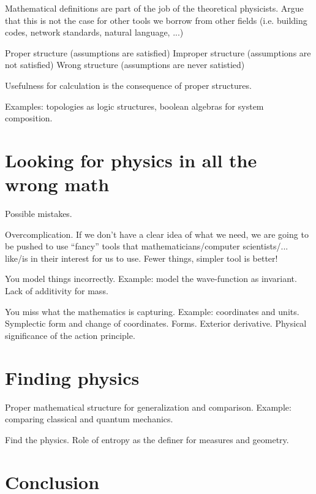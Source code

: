 \documentclass[10pt,twocolumn, nofootinbib]{revtex4-2}
\begin{document}
Mathematical definitions are part of the job of the theoretical physicists. Argue that this is not the case for other tools we borrow from other fields (i.e. building codes, network standards, natural language, ...)

Proper structure (assumptions are satisfied)
Improper structure (assumptions are not satisfied)
Wrong structure (assumptions are never satistied)

Usefulness for calculation is the consequence of proper structures.

Examples: topologies as logic structures, boolean algebras for system composition.

\section{Looking for physics in all the wrong math}

Possible mistakes.

Overcomplication. If we don't have a clear idea of what we need, we are going to be pushed to use ``fancy'' tools that mathematicians/computer scientists/... like/is in their interest for us to use. Fewer things, simpler tool is better!

You model things incorrectly. Example: model the wave-function as invariant. Lack of additivity for mass.

You miss what the mathematics is capturing. Example: coordinates and units. Symplectic form and change of coordinates. Forms. Exterior derivative. Physical significance of the action principle.

\section{Finding physics}

Proper mathematical structure for generalization and comparison. Example: comparing classical and quantum mechanics.

Find the physics. Role of entropy as the definer for measures and geometry.

\section{Conclusion}



\end{document}
